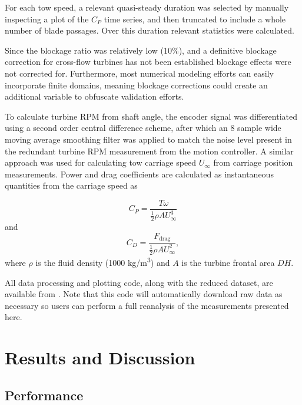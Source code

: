 \documentclass[10pt,letterpaper]{article}
\begin{document}
For each tow speed, a relevant quasi-steady duration was selected by manually
inspecting a plot of the $C_P$ time series, and then truncated to include a
whole number of blade passages. Over this duration relevant statistics were
calculated. 

Since the blockage ratio was relatively low (10\%), and a definitive blockage
correction for cross-flow turbines has not been established \cite{Cavagnaro2014}
blockage effects were not corrected for. Furthermore, most numerical modeling
efforts can easily incorporate finite domains, meaning blockage corrections
could create an additional variable to obfuscate validation efforts.

To calculate turbine RPM from shaft angle, the encoder signal was differentiated
using a second order central difference scheme, after which an 8 sample wide
moving average smoothing filter was applied to match the noise level present in
the redundant turbine RPM measurement from the motion controller. A similar
approach was used for calculating tow carriage speed $U_\infty$ from carriage
position measurements. Power and drag coefficients are calculated as
instantaneous quantities from the carriage speed as

\begin{equation}
    C_P = \frac{T \omega}{\frac{1}{2} \rho A U_\infty^3}
\end{equation}
and
\begin{equation}
    C_D = \frac{F_\mathrm{drag}}{\frac{1}{2} \rho A U_\infty^2},
\end{equation}
where $\rho$ is the fluid density (1000 kg/m\textsuperscript{3}) and $A$ is
the turbine frontal area $DH$.

All data processing and plotting code, along with the reduced dataset, are
available from \cite{Bachant2015-RM2-data}. Note that this code will
automatically download raw data as necessary so users can perform a full
reanalysis of the measurements presented here.


\section*{Results and Discussion}

\subsection*{Performance}
\end{document}
